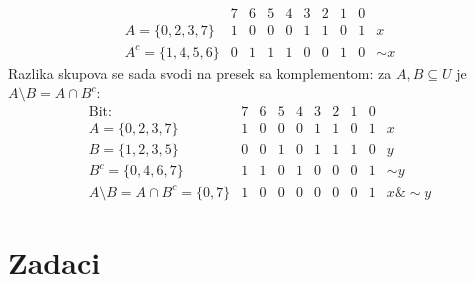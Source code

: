 $$
  \begin{array}{r|cccccccc|l}
                            & 7 & 6 & 5 & 4 & 3 & 2 & 1 & 0 \\ \hline
  A = \{0, 2, 3, 7\}        & 1 & 0 & 0 & 0 & 1 & 1 & 0 & 1 & x\\
  A^c= \{1, 4, 5, 6\}       & 0 & 1 & 1 & 1 & 0 & 0 & 1 & 0 & \sim x
  \end{array}
$$
Razlika skupova se sada svodi na presek sa komplementom: za $A, B \subseteq U$ je $A \setminus B = A \cap B^c$:
$$
  \begin{array}{r|cccccccc|l}
                           \text{Bit:}  & 7 & 6 & 5 & 4 & 3 & 2 & 1 & 0 \\ \hline
  A = \{0, 2, 3, 7\}                    & 1 & 0 & 0 & 0 & 1 & 1 & 0 & 1 & x\\
  B = \{1, 2, 3, 5\}                    & 0 & 0 & 1 & 0 & 1 & 1 & 1 & 0 & y\\
  B^c = \{0, 4, 6, 7\}                  & 1 & 1 & 0 & 1 & 0 & 0 & 0 & 1 & \sim y\\ \hline
  A \setminus B = A \cap B^c = \{0, 7\} & 1 & 0 & 0 & 0 & 0 & 0 & 0 & 1 & x\&\sim y
  \end{array}
$$

\section{Zadaci}



